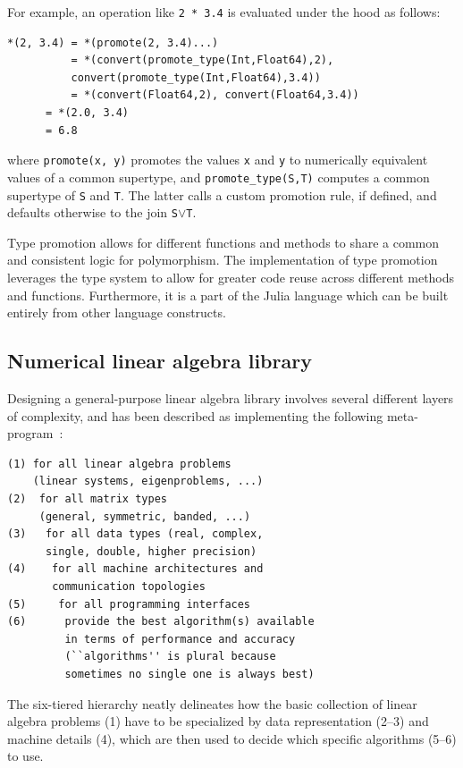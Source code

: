 \documentclass[10pt, preprint]{sigplanconf}
\begin{document}
For example, an operation like \verb|2 * 3.4| is evaluated under the hood as
follows:

\begin{lstlisting}
*(2, 3.4) = *(promote(2, 3.4)...)
          = *(convert(promote_type(Int,Float64),2),
	      convert(promote_type(Int,Float64),3.4))
          = *(convert(Float64,2), convert(Float64,3.4))
	  = *(2.0, 3.4)
	  = 6.8
\end{lstlisting}
%
where \verb|promote(x, y)| promotes the values \verb|x| and \verb|y| to
numerically equivalent values of a common supertype, and
\verb|promote_type(S,T)| computes a common supertype of \verb|S| and \verb|T|.
The latter calls a custom promotion rule, if defined, and defaults otherwise to
the join \verb|S|$\vee$\verb|T|.

Type promotion allows for different functions and methods to share a common and
consistent logic for polymorphism. The implementation of type promotion
leverages the type system to allow for greater code reuse across different
methods and functions. Furthermore, it is a part of the Julia language which
can be built entirely from other language constructs.


\subsection{Numerical linear algebra library}

Designing a general-purpose linear algebra library involves several different
layers of complexity, and has been described as implementing the following
meta-program~\cite{Demmel2007}:

{\small
\begin{verbatim}
(1) for all linear algebra problems
    (linear systems, eigenproblems, ...)
(2)  for all matrix types
     (general, symmetric, banded, ...)
(3)   for all data types (real, complex,
      single, double, higher precision)
(4)    for all machine architectures and
       communication topologies
(5)     for all programming interfaces
(6)      provide the best algorithm(s) available
         in terms of performance and accuracy
         (``algorithms'' is plural because
         sometimes no single one is always best)
\end{verbatim}
}
%
The six-tiered hierarchy neatly delineates how the basic collection of linear
algebra problems (1) have to be specialized by data representation (2--3) and
machine details (4), which are then used to decide which specific algorithms
(5--6) to use.
\end{document}
